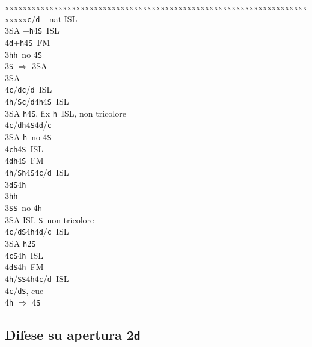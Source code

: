 \documentclass[a4paper,italian]{article}
\newcommand{\BS}{\small{\texttt{S}}}
\newcommand{\BC}{\small{\texttt{c}}}
\newcommand{\BD}{\small{\texttt{d}}}
\newcommand{\BH}{\small{\texttt{h}}}
\newcommand{\pdfd}{\texorpdfstring{\texttt{d}}{D}}
\newenvironment{bidtable}
{\begin{tabbing}

    xxxxxx\=xxxxxxxxx\=xxxxxxxxx\=xxxxxxx\=xxxxxxx\=xxxxxxx\=xxxxxxx\=xxxxxxx\=xxxxxxx\=xxxxxxx\=\kill}
{\end{tabbing} }%
\begin{document}
\begin{multicols}{2}
\begin{bidtable}
        4\BC/\BD {}+ nat ISL\-\-\\
        3\small{SA} +\BH4\BS\ ISL\\
        4\BD {}+\BH4\BS\ FM\-\\
        3\BH {}\BH\ no 4\BS \+\\
        3\BS \> $\Rightarrow$ 3\small{SA}\+\\
        3\small{SA}\+\\
        4\BC/\BD {}\BC /\BD\ ISL\\
        4\BH/\BS {}\BC /\BD 4\BH 4\BS\ ISL\-\-\\
        3\small{SA} \BH 4\BS , fix \BH\ ISL, non tricolore\\
        4\BC/\BD {}\BH 4\BS 4\BD /\BC \-\\
        3\small{SA} \BH\ no 4\BS \+\\
        4\BC {}\BH 4\BS\ ISL\\
        4\BD {}\BH 4\BS\ FM\\
        4\BH/\BS {}\BH4\BS4\BC/\BD\ ISL\-\-\\
        3\BD {}\BS 4\BH \+\\
        3\BH {}\BH \\
        3\BS {}\BS\ no 4\BH \+\\
        3\small{SA}\> ISL \BS\ non tricolore\\
        4\BC/\BD {}\BS 4\BH 4\BD /\BC\ ISL\-\\
        3\small{SA} \BH 2\BS \+\\
        4\BC {}\BS 4\BH\ ISL\\
        4\BD {}\BS 4\BH\ FM\\
        4\BH/\BS {}\BS 4\BH 4\BC /\BD\ ISL \-\\
        4\BC/\BD {}\BS, cue\+\\
        4\BH \> $\Rightarrow$ 4\BS

    \end{bidtable}
\end{multicols}

\subsection{Difese su apertura 2\pdfd}
\end{document}
